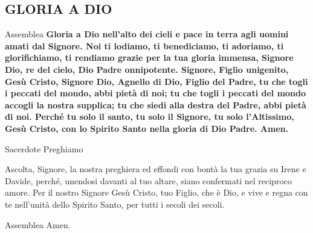
\subsection*{GLORIA A DIO}

\begin{dialoghi}
\item[Assemblea] \textbf{Gloria a Dio nell'alto dei cieli e pace in terra agli uomini amati dal Signore. Noi ti lodiamo, ti benediciamo, ti adoriamo, ti glorifichiamo, ti rendiamo grazie per la tua gloria immensa, Signore Dio, re del cielo, Dio Padre onnipotente. Signore, Figlio unigenito, Gesù Cristo, Signore Dio, Agnello di Dio, Figlio del Padre, tu che togli i peccati del mondo, abbi pietà di noi; tu che togli i peccati del mondo accogli la nostra supplica; tu che siedi alla destra del Padre, abbi pietà di noi. Perché tu solo il santo, tu solo il Signore, tu solo l'Altissimo, Gesù Cristo, con lo Spirito Santo nella gloria di Dio Padre. Amen.}
\item[Sacerdote] Preghiamo

Ascolta, Signore, la nostra preghiera ed effondi con bontà la tua grazia su Irene e Davide, perché, unendosi davanti al tuo altare, siano confermati nel reciproco amore. Per il nostro Signore Gesù Cristo, tuo Figlio, che è Dio, e vive e regna con te nell'unità dello Spirito Santo, per tutti i secoli dei secoli.
\item[Assemblea] Amen.
\end{dialoghi}
